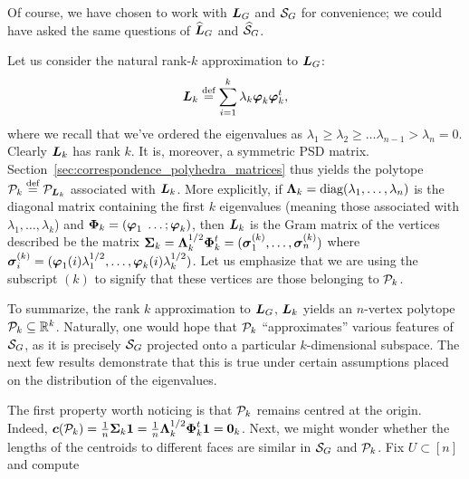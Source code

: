 Of course, we have chosen to work with $\L_G$ and $\splx_G$ for convenience; we could have asked the same questions of $\Ln_G$ and $\splxn_G$. 

Let us  consider the natural rank-$k$ approximation to $\L_G$: 
\begin{equation*}
\L_k\equiv \sum_{i=1}^k \lambda_k\vp_k\vp_k^\tp,
\end{equation*}
where we recall that  we've ordered  the eigenvalues  as $\lambda_1\geq \lambda_2\geq \dots\lambda_{n-1}>\lambda_n=0$. 
Clearly $\L_k$ has rank $k$.  It is, moreover, a symmetric PSD matrix.  Section~\ref{sec:correspondence_polyhedra_matrices} thus yields the polytope $\P_k\equiv \P_{\L_k}$ associated  with $\L_k$. More  explicitly, if 
$\Eval_k=\diag(\lambda_1,\dots,\lambda_n)$ is the diagonal  matrix containing the first $k$  eigenvalues (meaning those  associated  with  $\lambda_1,\dots,\lambda_k$) and $\Eig_k = (\vp_1\;\dots;\vp_k)$, then $\L_k$ is the Gram matrix of the vertices described be the matrix $\Sv_k = \Eval_k^{1/2}\Eig_k^\tp=(\sv_1^\k,\dots,\sv_n^\k)$ where $\sv_i^\k=(\vp_1(i)\lambda_1^{1/2},\dots,\vp_k(i)\lambda_k^{1/2})$. Let us emphasize that we  are using  the subscript $(k)$ to signify that these vertices are  those belonging to  $\P_k$. 

To  summarize, the rank $k$ approximation to $\L_G$, $\L_k$  yields an  $n$-vertex polytope  $\P_k\subset\R^k$. Naturally, one would hope that $\P_k$    ``approximates'' various features of $\splx_G$, as it is precisely $\splx_G$ projected  onto a particular $k$-dimensional subspace. The next few results  demonstrate that this is true under certain  assumptions placed on the distribution of the eigenvalues. 

The first property worth noticing is that $\P_k$ remains  centred at the  origin. Indeed,  $\cent(\P_k) = \frac{1}{n}\Sv_k\one = \frac{1}{n}\Eval_k^{1/2}\Eig_k^\tp\one=\zero_k$.  Next, we might wonder  whether the lengths of the  centroids to different faces  are similar in $\splx_G$ and $\P_k$. Fix  $U\subset [n]$ and compute 


